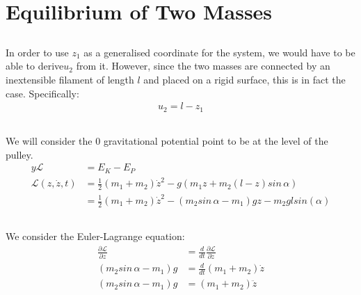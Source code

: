\documentclass{article}
\begin{document}
\subsection{} %



\subsection{} %

\section{Equilibrium of Two Masses}

\subsection{} %

In order to use $z_1$ as a generalised coordinate for the system, we would have to be able to derive$u_2$ from it. However, since the two masses are connected by an inextensible filament of length $l$ and placed on a rigid surface, this is in fact the case. Specifically:
\begin{align*}
	u_2 = l - z_1
\end{align*}

\subsection{} %

We will consider the 0 gravitational potential point to be at the level of the pulley.
\begin{align*}y
	\mathcal{L} &= E_{K} - E_P\\
	\mathcal{L}(z,\dot{z},t) &= \frac{1}{2}(m_1+m_2)\dot{z}^2 - g(m_1z + m_2(l-z)sin\,\alpha)\\
	&= \frac{1}{2}(m_1+m_2)\dot{z}^2 - (m_2sin\,\alpha - m_1)g z - m_2 g l sin(\alpha)
\end{align*}

\subsection{} %

We consider the Euler-Lagrange equation:
\begin{align*}
	\frac{\partial \mathcal{L}}{\partial z} &= \frac{d}{dt}\frac{\partial \mathcal{L}}{\partial \dot{z}}\\
	 (m_2sin\,\alpha - m_1)g &= \frac{d}{dt}(m_1 + m_2)\dot{z}\\
	 (m_2sin\,\alpha - m_1)g &= (m_1 + m_2)\ddot{z}
\end{align*}
\end{document}
